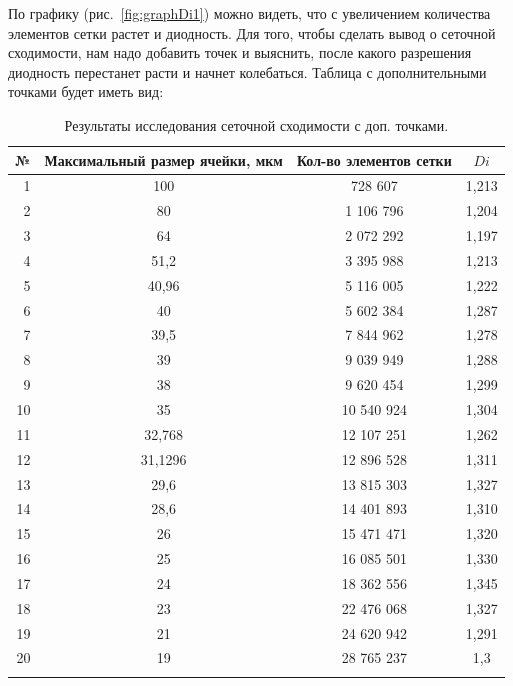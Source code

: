 \documentclass[14pt,a4paper]{article}
\begin{document}
        По графику (рис.~\ref{fig:graphDi1}) можно видеть, что с увеличением количества элементов сетки растет и диодность. Для того, чтобы сделать вывод о сеточной сходимости, нам надо добавить точек и выяснить, после какого разрешения диодность перестанет расти и начнет колебаться. Таблица с дополнительными точками будет иметь вид:
        \\
         \begin{table}[!htb]
            \begin{center}
                \caption{Результаты исследования сеточной сходимости с доп. точками.}
                 \begin{tabular}{rccc}
                     \hline
                     №      & Максимальный размер ячейки, мкм & Кол-во элементов сетки  & $Di$ \\
                     \hline
                     \hline
                     1	& 100		& 728 607		& 1,213		\\
                     2	& 80		& 1 106 796		& 1,204		\\
                     3  & 64		& 2 072 292		& 1,197		\\
                     4	& 51,2		& 3 395 988		& 1,213		\\
                     5	& 40,96		& 5 116 005		& 1,222		\\
                     6	& 40		& 5 602 384		& 1,287		\\
                     7	& 39,5		& 7 844 962		& 1,278		\\
                     8	& 39		& 9 039 949		& 1,288		\\
                     9	& 38		& 9 620 454		& 1,299		\\		
                     10	& 35		& 10 540 924	& 1,304		\\
                     11	& 32,768	& 12 107 251	& 1,262		\\
                     12	& 31,1296	& 12 896 528	& 1,311		\\
                     13	& 29,6		& 13 815 303	& 1,327		\\
                     14	& 28,6		& 14 401 893	& 1,310		\\
                     15	& 26		& 15 471 471	& 1,320		\\
                     16	& 25		& 16 085 501	& 1,330		\\
                     17	& 24	  	& 18 362 556	& 1,345		\\
                     18	& 23		& 22 476 068	& 1,327		\\
                     19	& 21		& 24 620 942	& 1,291		\\
                     20	& 19		& 28 765 237	& 1,3		\\
                     \hline
                     \label{fig:table2}
                 \end{tabular}
            \label{tab:tab2} 
            \end{center}
        \end{table}
         \\
         
\end{document}

